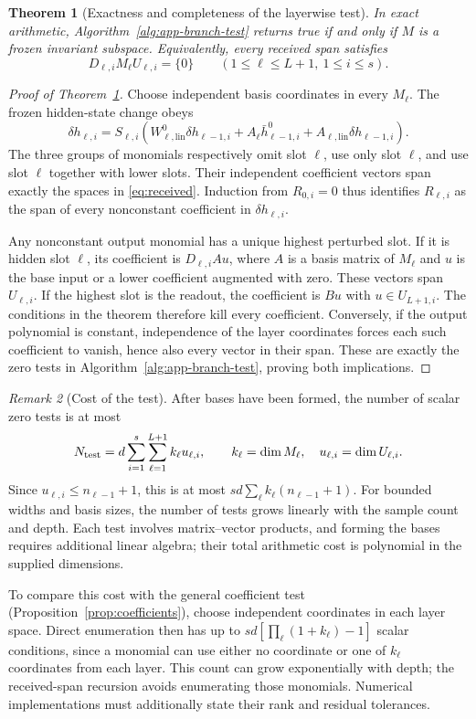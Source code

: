\documentclass[twoside]{article}
\newtheorem{theorem}{Theorem}
\theoremstyle{remark}
\newtheorem{remark}[theorem]{Remark}
\theoremstyle{highlightdefinition}
\theoremstyle{remark}
\begin{document}
\begin{theorem}[Exactness and completeness of the layerwise test]
\label{thm:composition}
In exact arithmetic, Algorithm~\ref{alg:app-branch-test} returns true if and only if $M$ is a frozen invariant subspace. Equivalently, every received span satisfies
\[
 D_{\ell,i}M_\ell U_{\ell,i}=\{0\}
 \qquad(1\le\ell\le L+1,\ 1\le i\le s).
\]
\end{theorem}
\begin{proof}[Proof of Theorem~\ref{thm:composition}]
Choose independent basis coordinates in every $M_\ell$. The frozen hidden-state change obeys
\[
 \delta h_{\ell,i}=S_{\ell,i}\left(
 W_{\ell,\mathrm{lin}}^0\delta h_{\ell-1,i}
 +A_\ell \bar h_{\ell-1,i}^0
 +A_{\ell,\mathrm{lin}}\delta h_{\ell-1,i}\right).
\]
The three groups of monomials respectively omit slot $\ell$, use only slot $\ell$, and use slot $\ell$ together with lower slots. Their independent coefficient vectors span exactly the spaces in \eqref{eq:received}. Induction from $R_{0,i}=0$ thus identifies $R_{\ell,i}$ as the span of every nonconstant coefficient in $\delta h_{\ell,i}$.

Any nonconstant output monomial has a unique highest perturbed slot. If it is hidden slot $\ell$, its coefficient is $D_{\ell,i}A u$, where $A$ is a basis matrix of $M_\ell$ and $u$ is the base input or a lower coefficient augmented with zero. These vectors span $U_{\ell,i}$. If the highest slot is the readout, the coefficient is $Bu$ with $u\in U_{L+1,i}$. The conditions in the theorem therefore kill every coefficient. Conversely, if the output polynomial is constant, independence of the layer coordinates forces each such coefficient to vanish, hence also every vector in their span. These are exactly the zero tests in Algorithm~\ref{alg:app-branch-test}, proving both implications.

\end{proof}

\begin{remark}[Cost of the test]
After bases have been formed, the number of scalar zero tests is at most
\[
 N_{\rm test}=d\sum_{i=1}^s\sum_{\ell=1}^{L+1}k_\ell u_{\ell,i},
 \qquad k_\ell=\dim M_\ell,\quad u_{\ell,i}=\dim U_{\ell,i}.
\]
Since $u_{\ell,i}\le n_{\ell-1}+1$, this is at most $sd\sum_\ell k_\ell(n_{\ell-1}+1)$. For bounded widths and basis sizes, the number of tests grows linearly with the sample count and depth. Each test involves matrix--vector products, and forming the bases requires additional linear algebra; their total arithmetic cost is polynomial in the supplied dimensions. 

To compare this cost with the general coefficient test (Proposition~\ref{prop:coefficients}), choose independent coordinates in each layer space. Direct enumeration then has up to $sd[\prod_\ell(1+k_\ell)-1]$ scalar conditions, since a monomial can use either no coordinate or one of $k_\ell$ coordinates from each layer. This count can grow exponentially with depth; the received-span recursion avoids enumerating those monomials. Numerical implementations must additionally state their rank and residual tolerances.
\end{remark}
\end{document}
